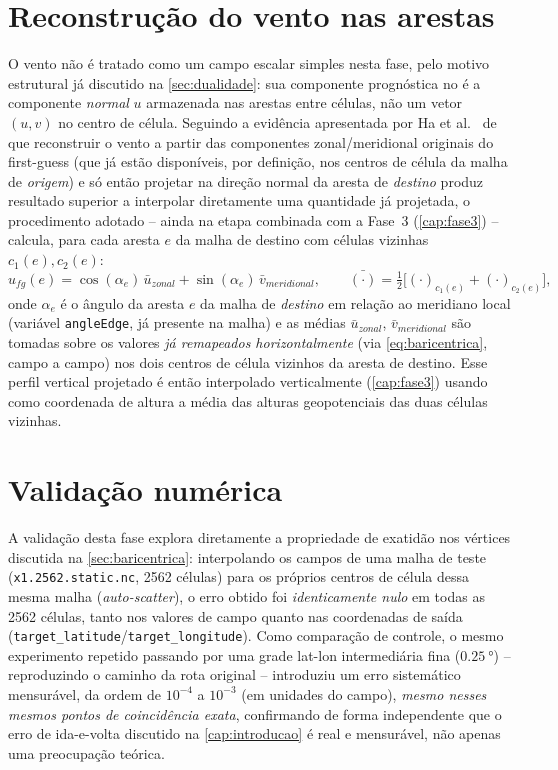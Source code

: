 \section{Reconstrução do vento nas arestas}
\label{sec:vento_arestas}

O vento não é tratado como um campo escalar simples nesta fase, pelo
motivo estrutural já discutido na \cref{sec:dualidade}: sua componente
prognóstica no \mpasa{} é a componente \emph{normal} $u$ armazenada nas
arestas entre células, não um vetor $(u,v)$ no centro de célula. Seguindo
a evidência apresentada por Ha et al.~\cite{ha2017enkf} de que reconstruir
o vento a partir das componentes zonal/meridional originais do
first-guess (que já estão disponíveis, por definição, nos centros de
célula da malha de \emph{origem}) e só então projetar na direção normal
da aresta de \emph{destino} produz resultado superior a interpolar
diretamente uma quantidade já projetada, o procedimento adotado -- ainda
na etapa combinada com a Fase~3 (\cref{cap:fase3}) -- calcula, para cada
aresta $e$ da malha de destino com células vizinhas $c_1(e), c_2(e)$:
\begin{equation}
  u_{fg}(e) = \cos(\alpha_e)\, \bar{u}_{zonal} + \sin(\alpha_e)\, \bar{v}_{meridional},
  \qquad
  \bar{(\cdot)} = \tfrac{1}{2}\big[(\cdot)_{c_1(e)} + (\cdot)_{c_2(e)}\big],
  \label{eq:vento_projecao}
\end{equation}
onde $\alpha_e$ é o ângulo da aresta $e$ da malha de \emph{destino} em
relação ao meridiano local (variável \texttt{angleEdge}, já presente na
malha) e as médias $\bar{u}_{zonal}$, $\bar{v}_{meridional}$ são tomadas
sobre os valores \emph{já remapeados horizontalmente} (via
\cref{eq:baricentrica}, campo a campo) nos dois centros de célula
vizinhos da aresta de destino. Esse perfil vertical projetado é então
interpolado verticalmente (\cref{cap:fase3}) usando como coordenada de
altura a média das alturas geopotenciais das duas células vizinhas.

\section{Validação numérica}
\label{sec:validacao_fase1}

A validação desta fase explora diretamente a propriedade de exatidão nos
vértices discutida na \cref{sec:baricentrica}: interpolando os campos de
uma malha de teste (\texttt{x1.2562.static.nc}, 2562 células) para os
próprios centros de célula dessa mesma malha (\emph{auto-\emph{scatter}}),
o erro obtido foi \emph{identicamente nulo} em todas as 2562 células,
tanto nos valores de campo quanto nas coordenadas de saída
(\texttt{target\_latitude}/\texttt{target\_longitude}). Como comparação
de controle, o mesmo experimento repetido passando por uma grade lat-lon
intermediária fina ($\SI{0.25}{\degree}$) -- reproduzindo o caminho da
rota original -- introduziu um erro sistemático mensurável, da ordem de
$10^{-4}$ a $10^{-3}$ (em unidades do campo), \emph{mesmo nesses mesmos
pontos de coincidência exata}, confirmando de forma independente que o
erro de ida-e-volta discutido na \cref{cap:introducao} é real e
mensurável, não apenas uma preocupação teórica.
